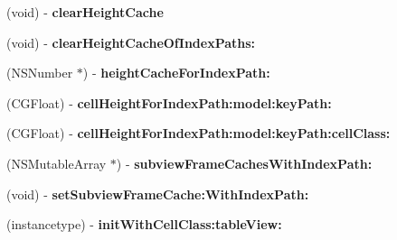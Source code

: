 \begin{DoxyCompactItemize}
(void) -\/ {\bfseries clear\+Height\+Cache}
\item 
\mbox{\label{interface_s_d_cell_auto_height_manager_adf4ca610ef22e747bb2df1a9f235aa14}} 
(void) -\/ {\bfseries clear\+Height\+Cache\+Of\+Index\+Paths\+:}
\item 
\mbox{\label{interface_s_d_cell_auto_height_manager_a4070468f90f41067d6738a1be234dfe7}} 
(N\+S\+Number $\ast$) -\/ {\bfseries height\+Cache\+For\+Index\+Path\+:}
\item 
\mbox{\label{interface_s_d_cell_auto_height_manager_a2a5896ec493fc5df80c9e1ff592c21c7}} 
(C\+G\+Float) -\/ {\bfseries cell\+Height\+For\+Index\+Path\+:model\+:key\+Path\+:}
\item 
\mbox{\label{interface_s_d_cell_auto_height_manager_af9c607476f787a5481ca8b36114347fd}} 
(C\+G\+Float) -\/ {\bfseries cell\+Height\+For\+Index\+Path\+:model\+:key\+Path\+:cell\+Class\+:}
\item 
\mbox{\label{interface_s_d_cell_auto_height_manager_a4f8cba36a583c453a5df1f7807403ea4}} 
(N\+S\+Mutable\+Array $\ast$) -\/ {\bfseries subview\+Frame\+Caches\+With\+Index\+Path\+:}
\item 
\mbox{\label{interface_s_d_cell_auto_height_manager_ab7d9fba723cd6ad3d9546d06406aacbc}} 
(void) -\/ {\bfseries set\+Subview\+Frame\+Cache\+:\+With\+Index\+Path\+:}
\item 
\mbox{\label{interface_s_d_cell_auto_height_manager_ac52143331c0c4acae103205e07a52b29}} 
(instancetype) -\/ {\bfseries init\+With\+Cell\+Class\+:table\+View\+:}
\end{DoxyCompactItemize}
